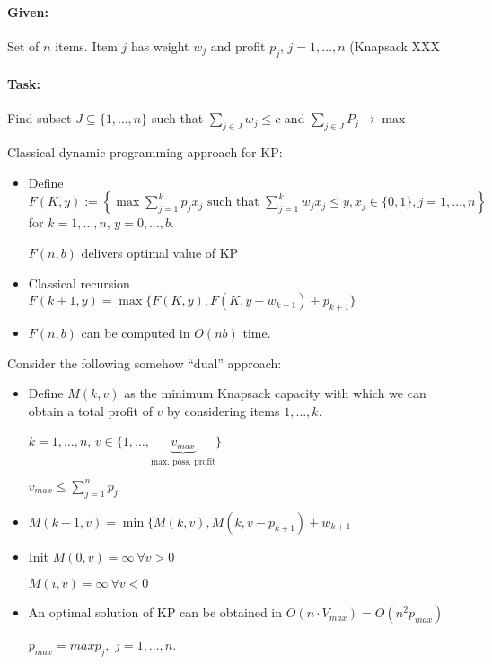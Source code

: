 \documentclass[11pt]{article}
\theoremstyle{definition}
\theoremstyle{definition}
\begin{document}
\paragraph{Given:} Set of $ n $ items. Item $ j $ has weight $ w_j $ and profit $ p_j $, $ j = 1, \dots, n $ (Knapsack XXX

\paragraph{Task:} Find subset $ J \subseteq \{1, \dots, n\} $ such that $ \sum \limits_{j \in J} w_j \leq c $ and $ \sum \limits_{j \in J} P_j \rightarrow \max $

Classical dynamic programming approach for KP:
\begin{itemize}
\item Define $ F(K, y) := \left\{ \max \sum_{j = 1}^k p_j x_j \text{ such that } \sum \limits_{j=1}^k w_j x_j \leq y, x_j \in \{0, 1\}, j = 1, \dots, n \right\} $ for $ k = 1, \dots, n $, $ y = 0, \dots, b $.

$ F(n, b) $ delivers optimal value of KP
\item Classical recursion $ F(k + 1, y) = \max \{F( K, y), F(K, y - w_{k + 1} ) + p_{k + 1} \} $
\item $ F(n, b) $ can be computed in $ O(n b) $ time.
\end{itemize}

Consider the following somehow ``dual'' approach:
\begin{itemize}
\item Define $ M(k, v) $ as the minimum Knapsack capacity with which we can obtain a total profit of $ v $ by considering items $ 1, \dots, k $.

$ k = 1, \dots, n $, $ v \in \{1, \dots, \underbrace{v_{max}}_{\text{max. poss. profit}} \} $ %

$ v_{max} \leq \sum \limits_{j = 1}^n p_j $

\item $ M(k + 1, v) = \min \{ M(k, v), M(k, v - p_{k + 1}) + w_{ k + 1} $

\item Init $ M(0, v) = \infty ~ \forall v > 0 $

$ M(i, v) = \infty ~ \forall v < 0 $


\item An optimal solution of KP can be obtained in $ O(n \cdot V_{max} ) = O(n ^2 p_{max}) $

$ p_{max} = max p_j,$ $ j = 1, \dots, n $.
\end{itemize}
\end{document}

